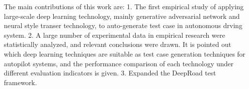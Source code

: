 \begin{eabstract}
  The main contributions of this work are: 1. The first empirical study of applying large-scale deep learning technology, mainly generative adversarial network and neural style transer technology, to auto-generate test case in autonomous drving system. 2. A large number of experimental data in empirical research were statistically analyzed, and relevant conclusions were drawn. It is pointed out which deep learning techniques are suitable as test case generation techniques for autopilot systems, and the performance comparison of each technology under different evaluation indicators is given. 3. Expanded the DeepRoad test framework.
\end{eabstract}

